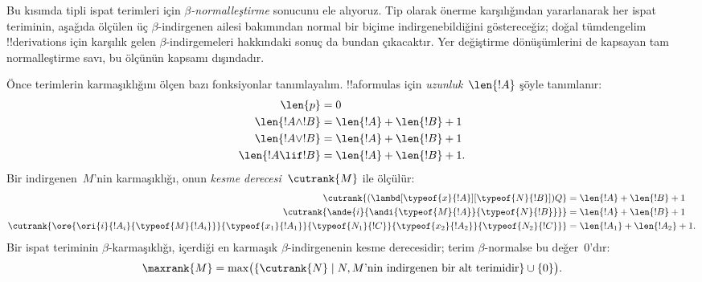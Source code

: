 



Bu kısımda tipli ispat terimleri için \emph{$\beta$-normalleştirme}
sonucunu ele alıyoruz. Tip olarak önerme karşılığından yararlanarak her ispat
teriminin, aşağıda ölçülen üç $\beta$-indirgenen ailesi bakımından normal bir
biçime indirgenebildiğini göstereceğiz; doğal tümdengelim !!{derivation}s için
karşılık gelen $\beta$-indirgemeleri hakkındaki sonuç da bundan çıkacaktır.
Yer değiştirme dönüşümlerini de kapsayan tam normalleştirme savı, bu ölçünün
kapsamı dışındadır.

Önce terimlerin karmaşıklığını ölçen bazı fonksiyonlar tanımlayalım.
!!a{formula}s için \emph{uzunluk}~$\len{!A}$ şöyle tanımlanır:
\begin{align*}
  \len{p} &= 0\\
  \len{!A \land !B} &= \len{!A} + \len{!B} + 1\\
  \len{!A \lor !B} &= \len{!A} + \len{!B} + 1 \\
  \len{!A \lif !B} &= \len{!A} + \len{!B} + 1.
\end{align*}
Bir indirgenen~$M$'nin karmaşıklığı, onun \emph{kesme
  derecesi}~$\cutrank{M}$ ile ölçülür:
\begin{align*}
  \cutrank{(\lambd[\typeof{x}{!A}][\typeof{N}{!B}])Q} &=
  \len{!A} + \len{!B} + 1 \\
  \cutrank{\ande{i}{\andi{\typeof{M}{!A}}{\typeof{N}{!B}}}} &=
  \len{!A} + \len{!B} + 1 \\
  \cutrank{\ore{\ori{i}{!A_{i}}{\typeof{M}{!A_i}}}
    {\typeof{x_1}{!A_1}}{\typeof{N_1}{!C}}
    {\typeof{x_2}{!A_2}}{\typeof{N_2}{!C}}} &=
  \len{!A_1} + \len{!A_2} + 1.
\end{align*}
Bir ispat teriminin $\beta$-karmaşıklığı, içerdiği en karmaşık
$\beta$-indirgenenin kesme derecesidir; terim $\beta$-normalse bu değer~$0$'dır:
\[
  \maxrank{M} = \max \bigl(\{\cutrank{N} \mid N, M\text{'nin indirgenen
    bir alt terimidir}\}\cup\{0\}\bigr).
\]

